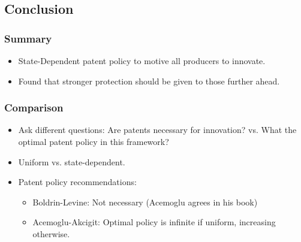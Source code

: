 \documentclass{beamer}
\begin{document}
\subsection{Conclusion}
\label{sub:conclusion}

\begin{frame}[t]\frametitle{Summary}
  \begin{itemize}
	  \vspace{15mm}
    \item<+-> State-Dependent patent policy to motive all producers to innovate.
	\vspace{2mm}
    \item<+-> Found that stronger protection should be given to those further ahead.
  \end{itemize}  
\end{frame}

\begin{frame}[t]\frametitle{Comparison}
  \begin{itemize}
	  \vspace{2mm}
    \item Ask different questions: Are patents necessary for innovation? vs. What the optimal patent policy in this framework?
	\vspace{2mm}
    \item Uniform vs. state-dependent.
	\vspace{2mm}
    \item Patent policy recommendations:
    \begin{itemize}
		\vspace{2mm}
      \item Boldrin-Levine: Not necessary (Acemoglu agrees in his book)
	  \vspace{2mm}
      \item Acemoglu-Akcigit: Optimal policy is infinite if uniform, increasing otherwise.
    \end{itemize}
  \end{itemize}

\end{frame}
\end{document}
